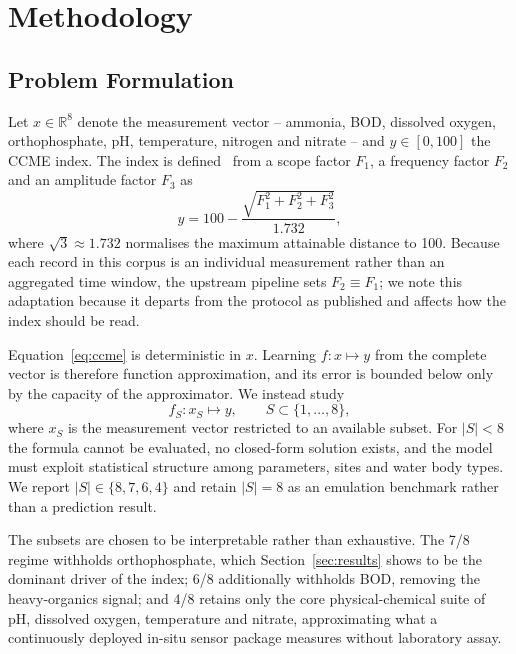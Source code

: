 \section{Methodology}
\label{sec:method}

\subsection{Problem Formulation}
Let $x \in \mathbb{R}^8$ denote the measurement vector -- ammonia, BOD, dissolved oxygen,
orthophosphate, pH, temperature, nitrogen and nitrate -- and $y \in [0,100]$ the CCME
index. The index is defined~\cite{ccme2001wqi} from a scope factor $F_1$, a frequency
factor $F_2$ and an amplitude factor $F_3$ as
\begin{equation}
    y = 100 - \frac{\sqrt{F_1^2 + F_2^2 + F_3^2}}{1.732},
    \label{eq:ccme}
\end{equation}
where $\sqrt{3} \approx 1.732$ normalises the maximum attainable distance to 100. Because
each record in this corpus is an individual measurement rather than an aggregated time
window, the upstream pipeline sets $F_2 \equiv F_1$; we note this adaptation because it
departs from the protocol as published and affects how the index should be read.

Equation~\eqref{eq:ccme} is deterministic in $x$. Learning $f : x \mapsto y$ from the
complete vector is therefore function approximation, and its error is bounded below only
by the capacity of the approximator. We instead study
\begin{equation}
    f_S : x_S \mapsto y, \qquad S \subset \{1,\dots,8\},
    \label{eq:partial}
\end{equation}
where $x_S$ is the measurement vector restricted to an available subset. For
$|S| < 8$ the formula cannot be evaluated, no closed-form solution exists, and the model
must exploit statistical structure among parameters, sites and water body types. We
report $|S| \in \{8,7,6,4\}$ and retain $|S| = 8$ as an emulation benchmark rather than a
prediction result.

The subsets are chosen to be interpretable rather than exhaustive. The 7/8 regime
withholds orthophosphate, which Section~\ref{sec:results} shows to be the dominant driver
of the index; 6/8 additionally withholds BOD, removing the heavy-organics signal; and 4/8
retains only the core physical-chemical suite of pH, dissolved oxygen, temperature and
nitrate, approximating what a continuously deployed in-situ sensor package measures
without laboratory assay.

